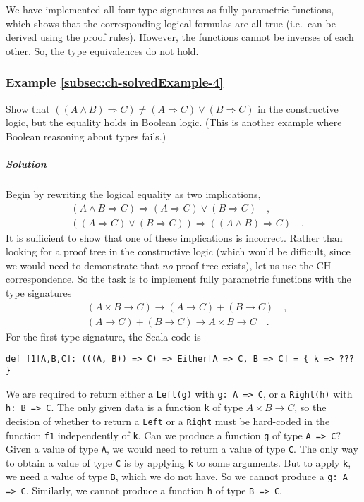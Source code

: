 We have implemented all four type signatures as fully parametric functions,
which shows that the corresponding logical formulas are all true (i.e.~can
be derived using the proof rules). However, the functions cannot be
inverses of each other. So, the type equivalences do not hold.

\subsubsection{Example \label{subsec:ch-solvedExample-4}\ref{subsec:ch-solvedExample-4}}

Show that $\left(\left(A\wedge B\right)\Rightarrow C\right)\neq(A\Rightarrow C)\vee(B\Rightarrow C)$
in the constructive logic, but the equality holds in Boolean logic.
(This is another example where Boolean reasoning about types fails.)

\subparagraph{Solution}

Begin by rewriting the logical equality as two implications,
\begin{align*}
 & (A\wedge B\Rightarrow C)\Rightarrow(A\Rightarrow C)\vee(B\Rightarrow C)\quad,\\
 & \left((A\Rightarrow C)\vee(B\Rightarrow C)\right)\Rightarrow\left(\left(A\wedge B\right)\Rightarrow C\right)\quad.
\end{align*}
It is sufficient to show that one of these implications is incorrect.
Rather than looking for a proof tree in the constructive logic (which
would be difficult, since we would need to demonstrate that \emph{no}
proof tree exists), let us use the CH correspondence. So the task
is to implement fully parametric functions with the type signatures
\begin{align*}
 & (A\times B\rightarrow C)\rightarrow(A\rightarrow C)+(B\rightarrow C)\quad,\\
 & (A\rightarrow C)+(B\rightarrow C)\rightarrow A\times B\rightarrow C\quad.
\end{align*}
For the first type signature, the Scala code is
\begin{lstlisting}
def f1[A,B,C]: (((A, B)) => C) => Either[A => C, B => C] = { k => ??? }
\end{lstlisting}
We are required to return either a \lstinline!Left(g)! with \lstinline!g: A => C!,
or a \lstinline!Right(h)! with \lstinline!h: B => C!. The only given
data is a function \lstinline!k! of type $A\times B\rightarrow C$,
so the decision of whether to return a \lstinline!Left! or a \lstinline!Right!
must be hard-coded in the function \lstinline!f1! independently of
\lstinline!k!. Can we produce a function \lstinline!g! of type \lstinline!A => C!?
Given a value of type \lstinline!A!, we would need to return a value
of type \lstinline!C!. The only way to obtain a value of type \lstinline!C!
is by applying \lstinline!k! to some arguments. But to apply \lstinline!k!,
we need a value of type \lstinline!B!, which we do not have. So we
cannot produce a \lstinline!g: A => C!. Similarly, we cannot produce
a function \lstinline!h! of type \lstinline!B => C!.

